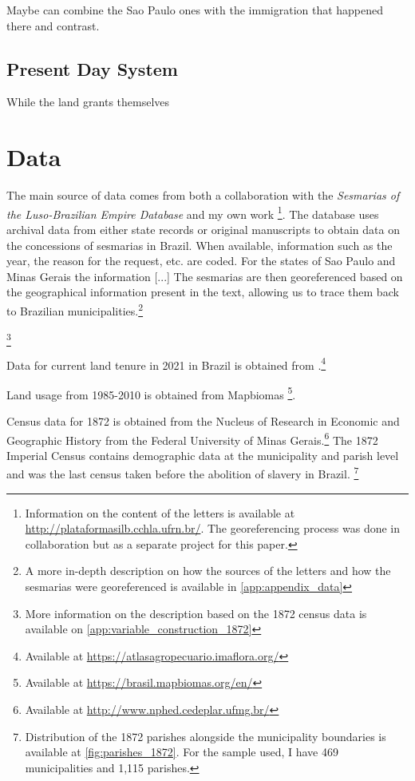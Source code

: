 \documentclass{article}
\begin{document}
\parencite{Panini1990-rj}

Maybe can combine the Sao Paulo ones with the immigration that happened there and contrast.

\subsection{Present Day System}

While the land grants themselves 

\section{Data}

The main source of data comes from both a collaboration with the \textit{Sesmarias of the Luso-Brazilian Empire Database} and my own work \footnote{
  Information on the content of the letters is available at \url{http://plataformasilb.cchla.ufrn.br/}. The georeferencing process was done in collaboration but as a separate project for this paper.}.
The database uses archival data from either state records or original manuscripts to obtain data on the concessions of sesmarias in Brazil. 
When available, information such as the year, the reason for the request, etc. are coded. 
For the states of Sao Paulo and Minas Gerais the information [...]
The sesmarias are then georeferenced based on the geographical information present in the text, allowing us to trace them back to Brazilian municipalities.\footnote{A more in-depth description on how the sources of the letters and how the sesmarias were georeferenced is available in \autoref{app:appendix_data}}

\footnote{More information on the description based on the 1872 census data is available on \autoref{app:variable_construction_1872}}

Data for current land tenure in 2021 in Brazil is obtained from \textcite{Sparovek2019-dn}.\footnote{
  Available at \url{https://atlasagropecuario.imaflora.org/}}

Land usage from 1985-2010 is obtained from Mapbiomas \parencite{Souza2020-kb}\footnote{
  Available at \url{https://brasil.mapbiomas.org/en/}}.

Census data for 1872 is obtained from the Nucleus of Research in Economic and Geographic History from the Federal University of Minas Gerais.\footnote{
  Available at \url{http://www.nphed.cedeplar.ufmg.br/}}
The 1872 Imperial Census contains demographic data at the municipality and parish level and was the last census taken before the abolition of slavery in Brazil. \footnote{Distribution of the 1872 parishes alongside the municipality boundaries is available at \autoref{fig:parishes_1872}. For the sample used, I have 469 municipalities and 1,115 parishes.}
\end{document}
